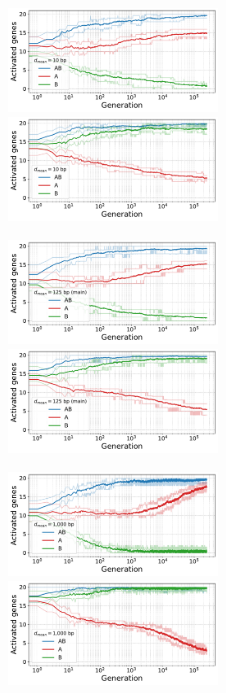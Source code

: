 \begin{figure}[H]
\centering
\includegraphics[width=0.495\textwidth]{param/mean-intergene/inter-0.01k/gene_activity_env_A.pdf}
\includegraphics[width=0.495\textwidth]{param/mean-intergene/inter-0.01k/gene_activity_env_B.pdf}

\includegraphics[width=0.495\textwidth]{param/mean-intergene/inter-0.125k/gene_activity_env_A.pdf}
\includegraphics[width=0.495\textwidth]{param/mean-intergene/inter-0.125k/gene_activity_env_B.pdf}

\includegraphics[width=0.495\textwidth]{param/mean-intergene/inter-1k/gene_activity_env_A.pdf}
\includegraphics[width=0.495\textwidth]{param/mean-intergene/inter-1k/gene_activity_env_B.pdf}


\end{figure}
